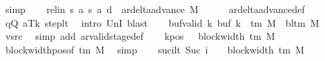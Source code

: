 \begin{isabellebody}
\ simp\isanewline
\ \ \isamarkupfalse%
\ rel{\isacharunderscore}{\kern0pt}in{\isacharcolon}{\kern0pt}\ {\isachardoublequoteopen}{\isacharparenleft}{\kern0pt}{\isacharquery}{\kern0pt}s{\isacharcomma}{\kern0pt}\ {\isacharquery}{\kern0pt}a{\isacharcomma}{\kern0pt}\ {\isacharquery}{\kern0pt}s{\isacharprime}{\kern0pt}{\isacharcomma}{\kern0pt}\ {\isacharquery}{\kern0pt}a{\isacharcomma}{\kern0pt}\ {\isacharquery}{\kern0pt}d{\isacharparenright}{\kern0pt}\ {\isasymin}\ ar{\isacharunderscore}{\kern0pt}delta{\isacharunderscore}{\kern0pt}advance\ M{\isachardoublequoteclose}\isanewline
\ \ \ \ \isamarkupfalse%
\ ar{\isacharunderscore}{\kern0pt}delta{\isacharunderscore}{\kern0pt}advance{\isacharunderscore}{\kern0pt}def\isanewline
\ \ \ \ \isamarkupfalse%
\ qQ\ aTk\ step{\isacharunderscore}{\kern0pt}lt\ \isamarkupfalse%
\ {\isacharparenleft}{\kern0pt}intro\ UnI{}{\isacharparenright}{\kern0pt}\ blast\isanewline
\ \ \isamarkupfalse%
\ buf{\isacharunderscore}{\kern0pt}valid{\isacharcolon}{\kern0pt}\ {\isachardoublequoteopen}{\isasymforall}k{\isachardot}{\kern0pt}\ buf\ k\ {\isasymin}\ {\isasymGamma}{\isacharunderscore}{\kern0pt}tm\ M\ {\isasymunion}\ {\isacharbraceleft}{\kern0pt}bl{\isacharunderscore}{\kern0pt}tm\ M{\isacharbraceright}{\kern0pt}{\isachardoublequoteclose}\isanewline
\ \ \ \ \isamarkupfalse%
\ vsrc\ \isamarkupfalse%
\ {\isacharparenleft}{\kern0pt}simp\ add{\isacharcolon}{\kern0pt}\ ar{\isacharunderscore}{\kern0pt}valid{\isacharunderscore}{\kern0pt}stage{\isacharunderscore}{\kern0pt}def{\isacharparenright}{\kern0pt}\isanewline
\ \ \isamarkupfalse%
\ kpos{\isacharcolon}{\kern0pt}\ {\isachardoublequoteopen}{}\ {\isacharless}{\kern0pt}\ block{\isacharunderscore}{\kern0pt}width\ {\isacharparenleft}{\kern0pt}{\isasymGamma}{\isacharunderscore}{\kern0pt}tm\ M{\isacharparenright}{\kern0pt}{\isachardoublequoteclose}\ \isamarkupfalse%
\ block{\isacharunderscore}{\kern0pt}width{\isacharunderscore}{\kern0pt}pos{\isacharbrackleft}{\kern0pt}of\ {\isachardoublequoteopen}{\isasymGamma}{\isacharunderscore}{\kern0pt}tm\ M{\isachardoublequoteclose}{\isacharbrackright}{\kern0pt}\ \isamarkupfalse%
\ simp\isanewline
\ \ \isamarkupfalse%
\ suc{\isacharunderscore}{\kern0pt}i{\isacharunderscore}{\kern0pt}lt{\isacharcolon}{\kern0pt}\ {\isachardoublequoteopen}Suc\ i\ {\isacharless}{\kern0pt}\ {}\ {\isacharasterisk}{\kern0pt}\ block{\isacharunderscore}{\kern0pt}width\ {\isacharparenleft}{\kern0pt}{\isasymGamma}{\isacharunderscore}{\kern0pt}tm\ M{\isacharparenright}{\kern0pt}{\isachardoublequoteclose}\isanewline

\end{isabellebody}

